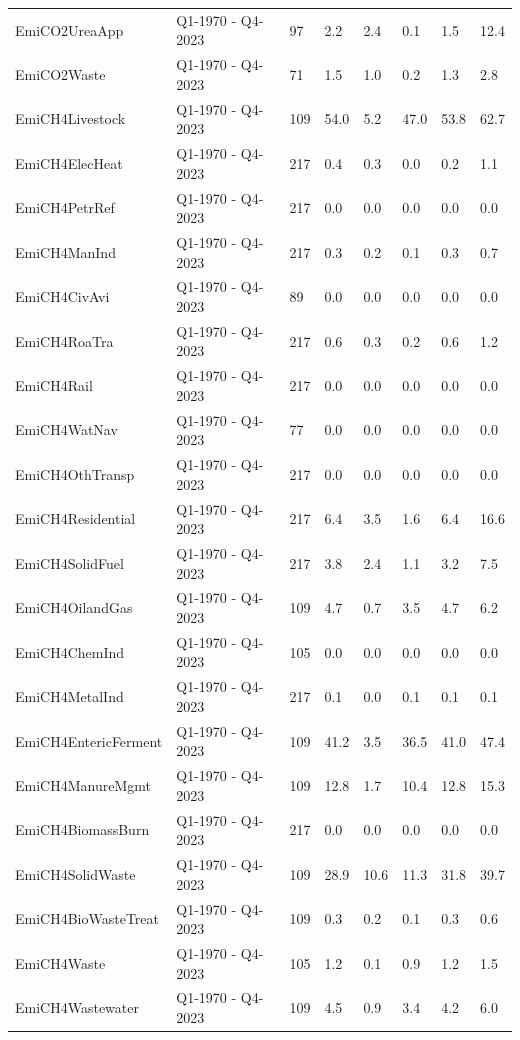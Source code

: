 \begin{longtable}[t]{llllllll}
EmiCO2UreaApp & Q1-1970 - Q4-2023 & 97 & 2.2 & 2.4 & 0.1 & 1.5 & 12.4\\
EmiCO2Waste & Q1-1970 - Q4-2023 & 71 & 1.5 & 1.0 & 0.2 & 1.3 & 2.8\\
EmiCH4Livestock & Q1-1970 - Q4-2023 & 109 & 54.0 & 5.2 & 47.0 & 53.8 & 62.7\\
\addlinespace
EmiCH4ElecHeat & Q1-1970 - Q4-2023 & 217 & 0.4 & 0.3 & 0.0 & 0.2 & 1.1\\
EmiCH4PetrRef & Q1-1970 - Q4-2023 & 217 & 0.0 & 0.0 & 0.0 & 0.0 & 0.0\\
EmiCH4ManInd & Q1-1970 - Q4-2023 & 217 & 0.3 & 0.2 & 0.1 & 0.3 & 0.7\\
EmiCH4CivAvi & Q1-1970 - Q4-2023 & 89 & 0.0 & 0.0 & 0.0 & 0.0 & 0.0\\
EmiCH4RoaTra & Q1-1970 - Q4-2023 & 217 & 0.6 & 0.3 & 0.2 & 0.6 & 1.2\\
\addlinespace
EmiCH4Rail & Q1-1970 - Q4-2023 & 217 & 0.0 & 0.0 & 0.0 & 0.0 & 0.0\\
EmiCH4WatNav & Q1-1970 - Q4-2023 & 77 & 0.0 & 0.0 & 0.0 & 0.0 & 0.0\\
EmiCH4OthTransp & Q1-1970 - Q4-2023 & 217 & 0.0 & 0.0 & 0.0 & 0.0 & 0.0\\
EmiCH4Residential & Q1-1970 - Q4-2023 & 217 & 6.4 & 3.5 & 1.6 & 6.4 & 16.6\\
EmiCH4SolidFuel & Q1-1970 - Q4-2023 & 217 & 3.8 & 2.4 & 1.1 & 3.2 & 7.5\\
\addlinespace
EmiCH4OilandGas & Q1-1970 - Q4-2023 & 109 & 4.7 & 0.7 & 3.5 & 4.7 & 6.2\\
EmiCH4ChemInd & Q1-1970 - Q4-2023 & 105 & 0.0 & 0.0 & 0.0 & 0.0 & 0.0\\
EmiCH4MetalInd & Q1-1970 - Q4-2023 & 217 & 0.1 & 0.0 & 0.1 & 0.1 & 0.1\\
EmiCH4EntericFerment & Q1-1970 - Q4-2023 & 109 & 41.2 & 3.5 & 36.5 & 41.0 & 47.4\\
EmiCH4ManureMgmt & Q1-1970 - Q4-2023 & 109 & 12.8 & 1.7 & 10.4 & 12.8 & 15.3\\
\addlinespace
EmiCH4BiomassBurn & Q1-1970 - Q4-2023 & 217 & 0.0 & 0.0 & 0.0 & 0.0 & 0.0\\
EmiCH4SolidWaste & Q1-1970 - Q4-2023 & 109 & 28.9 & 10.6 & 11.3 & 31.8 & 39.7\\
EmiCH4BioWasteTreat & Q1-1970 - Q4-2023 & 109 & 0.3 & 0.2 & 0.1 & 0.3 & 0.6\\
EmiCH4Waste & Q1-1970 - Q4-2023 & 105 & 1.2 & 0.1 & 0.9 & 1.2 & 1.5\\
EmiCH4Wastewater & Q1-1970 - Q4-2023 & 109 & 4.5 & 0.9 & 3.4 & 4.2 & 6.0\\

\end{longtable}
